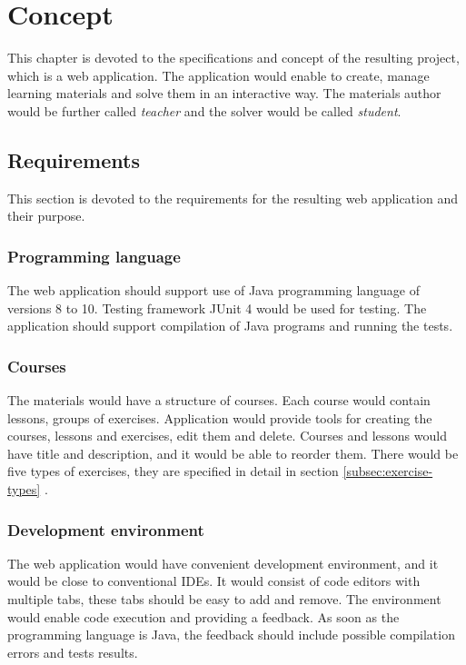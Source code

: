 \chapter[Concept]{Concept}
\label{ch:concept}

This chapter is devoted to the specifications and concept of the resulting project, which is a web application. The application would enable to create, manage learning materials and solve them in an interactive way. The materials author would be further called \textit{teacher} and the solver would be called \textit{student}.

    \section{Requirements}
    \label{sec:requirements}
    This section is devoted to the requirements for the resulting web application and their purpose.
    
        \subsection{Programming language}
        The web application should support use of Java programming language of versions 8 to 10. Testing framework JUnit 4 would be used for testing. The application should support compilation of Java programs and running the tests.
        
    
        \subsection{Courses}
        The materials would have a structure of courses. Each course would contain lessons, groups of exercises. Application would provide tools for creating the courses, lessons and exercises, edit them and delete. Courses and lessons would have title and description, and it would be able to reorder them. There would be five types of exercises, they are specified in detail in section \ref{subsec:exercise-types} .
        
        \subsection{Development environment}
        The web application would have convenient development environment, and it would be close to conventional IDEs. It would consist of code editors with multiple tabs, these tabs should be easy to add and remove. The environment would enable code execution and providing a feedback. As soon as the programming language is Java, the feedback should include possible compilation errors and tests results.
        
